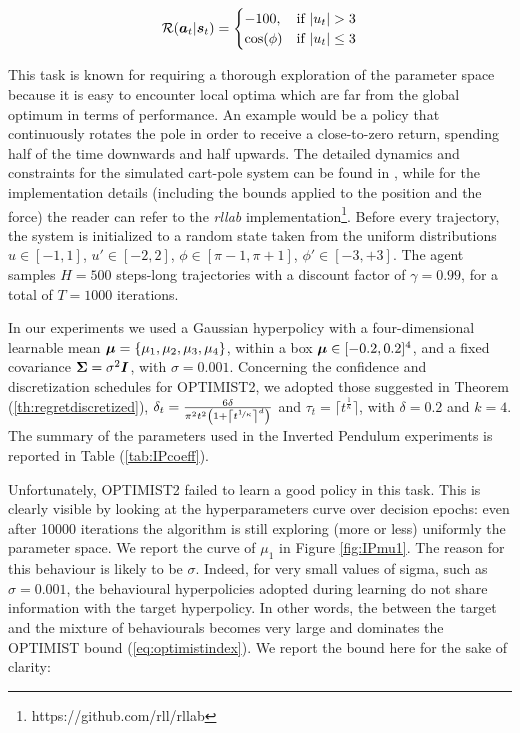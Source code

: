 \begin{equation}
\Rew(\boldsymbol{a}_t|\boldsymbol{s}_t)= \begin{cases}-100, &\text{if $|u_t|>3$} \\ \cos(\phi) &\text{if $|u_t|\leq3$} \end{cases}
\end{equation}

This task is known for requiring a thorough exploration of the parameter space because it is easy to encounter local optima which are far from the global optimum in terms of performance. An example would be a policy that continuously rotates the pole in order to receive a close-to-zero return, spending half of the time downwards and half upwards. The detailed dynamics and constraints for the simulated cart-pole system can be found in \cite{kimura1999efficient}, while for the implementation details (including the bounds applied to the position and the force) the reader can refer to the \emph{rllab} implementation\footnote{https://github.com/rll/rllab}.  Before every trajectory, the system is initialized to a random state taken from the uniform distributions $u\in[-1,1]$, $u'\in[-2,2]$, $\phi\in[\pi-1,\pi+1]$, $\phi'\in[-3,+3]$. The agent samples $H=500$ steps-long trajectories with a discount factor of $\gamma=0.99$, for a total of $T=1000$ iterations.

In our experiments we used a Gaussian hyperpolicy with a four-dimensional learnable mean $\boldsymbol{\mu}=\{\mu_1, \mu_2, \mu_3, \mu_4\}$, within a box $\boldsymbol{\mu}\in[-0.2,0.2]^4$, and a fixed covariance $\boldsymbol{\Sigma}=\sigma^2\boldsymbol{I}$, with $\sigma=0.001$. Concerning the confidence and discretization schedules for \gls{OPTIMIST}2, we adopted those suggested in Theorem (\ref{th:regretdiscretized}), \ie ${\delta_t = \frac{6\delta}{\pi^2t^2\left(1+\left\lceil t^{\nicefrac{1}{\kappa}}\right\rceil^d\right)}}$ and $\tau_t=\lceil t^{\frac{1}{\kappa}} \rceil$, with $\delta=0.2$ and $k=4$. The summary of the parameters used in the Inverted Pendulum experiments is reported in Table (\ref{tab:IPcoeff}).

Unfortunately, \gls{OPTIMIST}2 failed to learn a good policy in this task. This is clearly visible by looking at the hyperparameters curve over decision epochs: even after 10000 iterations the algorithm is still exploring (more or less) uniformly the parameter space. We report the curve of $\mu_1$ in Figure \ref{fig:IPmu1}. The reason for this behaviour is likely to be $\sigma$. Indeed, for very small values of sigma, such as $\sigma=0.001$, the behavioural hyperpolicies adopted during learning do not share information with the target hyperpolicy. In other words, the \Renyi between the target and the mixture of behaviourals becomes very large and dominates the \gls{OPTIMIST} bound (\ref{eq:optimistindex}). We report the bound here for the sake of clarity:

